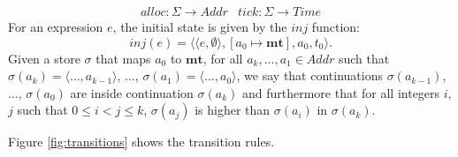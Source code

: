 \RequirePackage[hyphens]{url}\documentclass[12pt,oneside]{amsart}
\newcommand{\kw}[1]{\mathbf{#1}}
\begin{document}
\[\begin{array}{cc}
    alloc : \Sigma \rightarrow Addr & tick : \Sigma \rightarrow Time
\end{array}\]
For an expression $e$, the initial state is given by the $inj$ function:
\[inj(e) =
    \langle\langle e, \emptyset\rangle, [a_0\mapsto\kw{mt}], a_0, t_0\rangle.\]
Given a store $\sigma$ that maps $a_0$ to $\kw{mt}$, for all $a_k,\ldots,a_1\in Addr$ such that $\sigma\left(a_k\right) = \langle\ldots, a_{k-1}\rangle$, $\ldots$, $\sigma\left(a_1\right) = \langle\ldots, a_0\rangle$, we say that continuations $\sigma\left(a_{k-1}\right)$, $\ldots$, $\sigma\left(a_0\right)$ are inside continuation $\sigma\left(a_k\right)$ and furthermore that for all integers $i$, $j$ such that $0 \leq i < j \leq k$, $\sigma\left(a_j\right)$ is higher than $\sigma\left(a_i\right)$ in $\sigma\left(a_k\right)$.

Figure \ref{fig:transitions} shows the transition rules.
\end{document}
